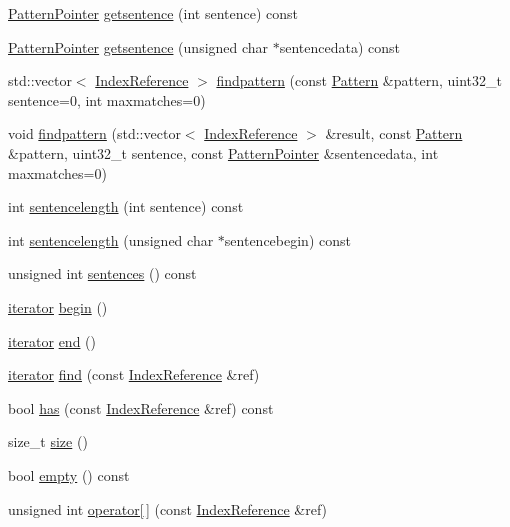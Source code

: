 \begin{DoxyCompactItemize}
\item 
\hyperlink{classPatternPointer}{Pattern\+Pointer} \hyperlink{classIndexedCorpus_ad181728adf70c795d8d969d8813e7502}{getsentence} (int sentence) const 
\item 
\hyperlink{classPatternPointer}{Pattern\+Pointer} \hyperlink{classIndexedCorpus_a38017ee00cfa8218e1f362980bbabed5}{getsentence} (unsigned char $\ast$sentencedata) const 
\item 
std\+::vector$<$ \hyperlink{classIndexReference}{Index\+Reference} $>$ \hyperlink{classIndexedCorpus_aae1a89d3682a2b356f61e3c1fc335e7b}{findpattern} (const \hyperlink{classPattern}{Pattern} \&pattern, uint32\+\_\+t sentence=0, int maxmatches=0)
\item 
void \hyperlink{classIndexedCorpus_af8b7d741687477e83c1c07628ab12fe8}{findpattern} (std\+::vector$<$ \hyperlink{classIndexReference}{Index\+Reference} $>$ \&result, const \hyperlink{classPattern}{Pattern} \&pattern, uint32\+\_\+t sentence, const \hyperlink{classPatternPointer}{Pattern\+Pointer} \&sentencedata, int maxmatches=0)
\item 
int \hyperlink{classIndexedCorpus_a33e0bdd2bc93e29de9dfe5917b227197}{sentencelength} (int sentence) const 
\item 
int \hyperlink{classIndexedCorpus_a71e94ea8a361b3b6ea8ba6ba98c449fd}{sentencelength} (unsigned char $\ast$sentencebegin) const 
\item 
unsigned int \hyperlink{classIndexedCorpus_ac402b5450e2b33bef72f222f1cd057c1}{sentences} () const 
\item 
\hyperlink{classIndexedCorpus_1_1iterator}{iterator} \hyperlink{classIndexedCorpus_aa8be0b3a2a730fccd755a9e12b74f869}{begin} ()
\item 
\hyperlink{classIndexedCorpus_1_1iterator}{iterator} \hyperlink{classIndexedCorpus_a9153a4018b224d89f49a5435dd795d8b}{end} ()
\item 
\hyperlink{classIndexedCorpus_1_1iterator}{iterator} \hyperlink{classIndexedCorpus_aae1ae54b38d7df66e9195441c0df18cd}{find} (const \hyperlink{classIndexReference}{Index\+Reference} \&ref)
\item 
bool \hyperlink{classIndexedCorpus_a51ac4a603352deb4937a4c75baa1944b}{has} (const \hyperlink{classIndexReference}{Index\+Reference} \&ref) const 
\item 
size\+\_\+t \hyperlink{classIndexedCorpus_a5b885b8a73ac33a90f505617d737c848}{size} ()
\item 
bool \hyperlink{classIndexedCorpus_a71486367cec99431560824d21d90a6bc}{empty} () const 
\item 
unsigned int \hyperlink{classIndexedCorpus_a9d5e81d01808cd4cd99b612575cbf7e5}{operator\mbox{[}$\,$\mbox{]}} (const \hyperlink{classIndexReference}{Index\+Reference} \&ref)
\end{DoxyCompactItemize}
